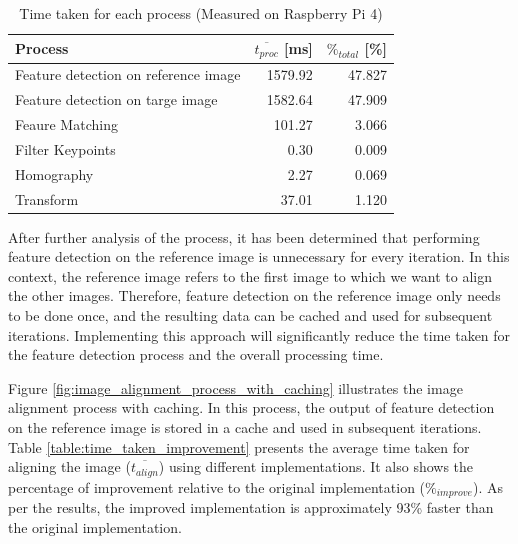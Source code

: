 \begin{table}[!ht]
    \centering
    \begin{tabular}{|l|r|r|}
        \hline
        \textbf{Process}                     & \textbf{$\overline{t_{proc}}$ [ms]} & \textbf{$\%_{total}$ [\%]} \\ \hline
        Feature detection on reference image & 1579.92                             & 47.827                     \\ \hline
        Feature detection on targe image     & 1582.64                             & 47.909                     \\ \hline
        Feaure Matching                      & 101.27                              & 3.066                      \\ \hline
        Filter Keypoints                     & 0.30                                & 0.009                      \\ \hline
        Homography                           & 2.27                                & 0.069                      \\ \hline
        Transform                            & 37.01                               & 1.120                      \\ \hline
    \end{tabular}
    \caption{Time taken for each process (Measured on Raspberry Pi 4)}
    \label{table:time_taken}
\end{table}


After further analysis of the process, it has been determined that performing feature detection on the reference image is unnecessary for every iteration. In this context, the reference image refers to the first image to which we want to align the other images. Therefore, feature detection on the reference image only needs to be done once, and the resulting data can be cached and used for subsequent iterations. Implementing this approach will significantly reduce the time taken for the feature detection process and the overall processing time.

Figure \ref{fig:image_alignment_process_with_caching} illustrates the image alignment process with caching. In this process, the output of feature detection on the reference image is stored in a cache and used in subsequent iterations. Table \ref{table:time_taken_improvement} presents the average time taken for aligning the image ($\overline{t_{align}}$) using different implementations. It also shows the percentage of improvement relative to the original implementation ($\%_{improve}$). As per the results, the improved implementation is approximately 93\% faster than the original implementation.

